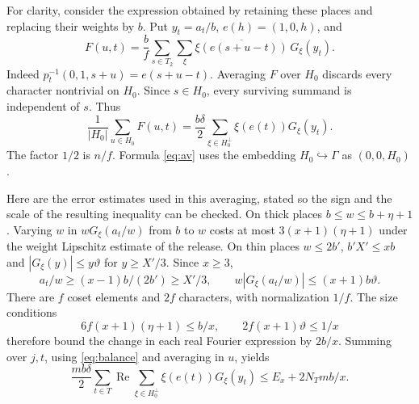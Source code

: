 \documentclass[11pt,a4paper]{article}
\theoremstyle{definition}\newtheorem{arithinput}[theorem]{Arithmetic input}
\newcommand{\re}{\operatorname{Re}}\newcommand{\im}{\operatorname{Im}}\newcommand{\Res}{\operatorname*{Res}}\newcommand{\rank}{\operatorname{rk}}
\begin{document}
For clarity, consider the expression obtained by retaining these places and replacing their weights by $b$. Put $y_t=a_t/b$, $e(h)=(1,0,h)$, and
\[
 F(u,t)=\frac b f\sum_{s\in T_2}\sum_\xi
     \overline{\xi(e(s+u-t))}\,G_\xi(y_t).
\]
Indeed $p_t^{-1}(0,1,s+u)=e(s+u-t)$. Averaging $F$ over $H_0$ discards every character nontrivial on $H_0$. Since $s\in H_0$, every surviving summand is independent of $s$. Thus
\begin{equation}
 \frac1{|H_0|}\sum_{u\in H_0}F(u,t)
  =\frac{b\delta}{2}\sum_{\xi\in H_0^\perp}\xi(e(t))G_\xi(y_t).
 \label{eq:av}
\end{equation}
The factor $1/2$ is $n/f$. Formula \eqref{eq:av} uses the embedding $H_0\hookrightarrow\Gamma$ as $(0,0,H_0)$.

Here are the error estimates used in this averaging, stated so the sign and the scale of the resulting inequality can be checked. On thick places $b\le w\le b+\eta+1$. Varying $w$ in $wG_\xi(a_t/w)$ from $b$ to $w$ costs at most $3(x+1)(\eta+1)$ under the weight Lipschitz estimate of the release. On thin places $w\le2b'$, $b'X'\le xb$ and $|G_\xi(y)|\le y\vartheta$ for $y\ge X'/3$. Since $x\ge3$,
\[
 a_t/w\ge (x-1)b/(2b')\ge X'/3,
 \qquad w|G_\xi(a_t/w)|\le(x+1)b\vartheta.
\]
There are $f$ coset elements and $2f$ characters, with normalization $1/f$. The size conditions
\[
 6f(x+1)(\eta+1)\le b/x,\qquad 2f(x+1)\vartheta\le 1/x
\]
therefore bound the change in each real Fourier expression by $2b/x$. Summing over $j,t$, using \eqref{eq:balance} and averaging in $u$, yields
\begin{equation}
 \frac{mb\delta}{2}\sum_{t\in T}\re\sum_{\xi\in H_0^\perp}\xi(e(t))G_\xi(y_t)
 \le E_x+2N_Tmb/x.\label{eq:avup}
\end{equation}
\end{document}
